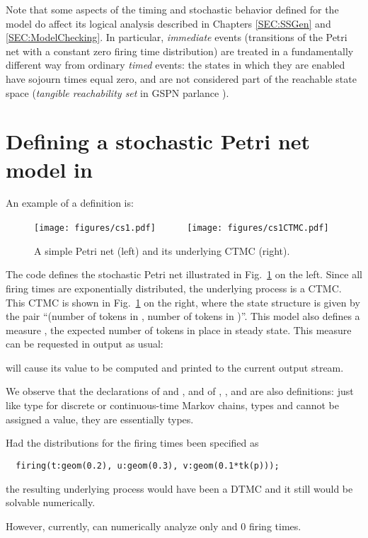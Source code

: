 Note that some aspects of the timing and stochastic behavior defined for the
model do affect its logical analysis described in Chapters \ref{SEC:SSGen}
and \ref{SEC:ModelChecking}.
In particular, \emph{immediate} events (transitions of the Petri net
with a constant zero firing time distribution)
are treated in a fundamentally different way from ordinary
\emph{timed} events: the states in which they are enabled
have sojourn times equal zero, and are not considered part of
the reachable state space (\emph{tangible reachability set} in
GSPN parlance \cite{Ajmone1995book}).



\section{Defining a stochastic Petri net model in {\smart}} \label{SEC:SPNdef}

An example of a  definition is:
%

%
\begin{figure}
  \centering
  \texttt{[image: figures/cs1.pdf]}
  ~~~~~
  \texttt{[image: figures/cs1CTMC.pdf]}
  \caption{A simple Petri net (left) and its underlying CTMC (right).}
  \label{FIG:cs1}
\end{figure} 
%
The code defines the stochastic Petri net  illustrated
in Fig.~\ref{FIG:cs1} on the left.
Since all firing times are exponentially distributed, the underlying
process is a CTMC.
This CTMC is shown in Fig.~\ref{FIG:cs1} on the right, where the state
structure is given by the pair
``(number of tokens in , number of tokens in )''.
This  model also defines a measure , the
expected number of tokens in place  in steady state.
This measure can be requested in output as usual:
%

%
will cause its value to be computed and printed to the current output stream.

We observe that the declarations of  and , and of ,
, and  are also definitions:
just like type  for discrete or continuous-time Markov chains,
types  and  cannot be assigned a value,
they are essentially  types.

Had the distributions for the firing times been specified as
\begin{lstlisting}
  firing(t:geom(0.2), u:geom(0.3), v:geom(0.1*tk(p)));
\end{lstlisting}
the resulting underlying process would have been a DTMC and it still would
be solvable numerically.
\begin{release}
However, currently, \smart{} can numerically analyze only
 and 0 firing times.
\end{release}


